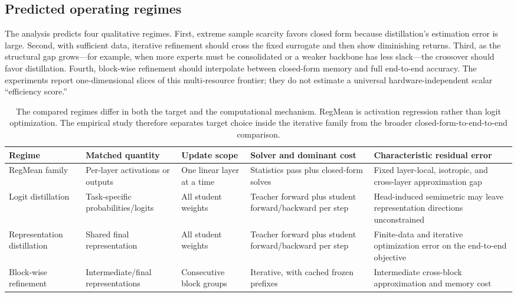 \documentclass[letterpaper]{article} %
\theoremstyle{plain}
\theoremstyle{definition}
\begin{document}
\subsection{Predicted operating regimes}
\label{sec:predictions}

The analysis predicts four qualitative regimes.
First, extreme sample scarcity favors closed form because distillation's estimation error is large.
Second, with sufficient data, iterative refinement should cross the fixed surrogate and then show diminishing returns.
Third, as the structural gap grows---for example, when more experts must be consolidated or a weaker backbone has less slack---the crossover should favor distillation.
Fourth, block-wise refinement should interpolate between closed-form memory and full end-to-end accuracy.
The experiments report one-dimensional slices of this multi-resource frontier; they do not estimate a universal hardware-independent scalar ``efficiency score.''

\begin{table}[tb]
\centering
\small
\setlength{\tabcolsep}{4pt}
\begin{tabular}{p{}p{}p{}p{}p{}}
\toprule
Regime & Matched quantity & Update scope & Solver and dominant cost & Characteristic residual error \\
\midrule
RegMean family & Per-layer activations or outputs & One linear layer at a time & Statistics pass plus closed-form solves & Fixed layer-local, isotropic, and cross-layer approximation gap \\
Logit distillation & Task-specific probabilities/logits & All student weights & Teacher forward plus student forward/backward per step & Head-induced semimetric may leave representation directions unconstrained \\
Representation distillation & Shared final representation & All student weights & Teacher forward plus student forward/backward per step & Finite-data and iterative optimization error on the end-to-end objective \\
Block-wise refinement & Intermediate/final representations & Consecutive block groups & Iterative, with cached frozen prefixes & Intermediate cross-block approximation and memory cost \\
\bottomrule
\end{tabular}
\caption{The compared regimes differ in both the target and the computational mechanism.
RegMean is activation regression rather than logit optimization.
The empirical study therefore separates target choice inside the iterative family from the broader closed-form-to-end-to-end comparison.}
\label{tab:regime-comparison}
\end{table}
\end{document}
